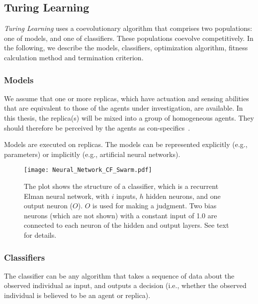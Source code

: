 \subsection{Turing Learning}\label{sec:turing_learning_swarm_simulation}

\textit{Turing Learning} uses a coevolutionary algorithm that comprises two populations: one of models, and one of classifiers. These populations coevolve competitively. In the following, we describe the models, classifiers, optimization algorithm, fitness calculation method and termination criterion. 

\subsubsection{Models} 

We assume that one or more replicas, which have actuation and sensing abilities that are equivalent to those of the agents under investigation, are available. In this thesis, the replica(s) will be mixed into a group of homogeneous agents. They should therefore be perceived by the agents as con-specifics~\cite{J.Halloy2007}. 

Models are executed on replicas. The models can be represented explicitly (e.g., parameters) or implicitly (e.g., artificial neural networks). %

\begin{figure}[!t]
	\centering
	\texttt{[image: Neural\_Network\_CF\_Swarm.pdf]}
	\caption{The plot shows the structure of a classifier, which is a recurrent Elman neural 
    network, with $i$ inputs, $h$ hidden neurons, and one output neuron ($O$). $O$ is used for making a judgment. Two bias neurons (which are not shown) with a constant input of 1.0 are connected to each neuron of the hidden and output layers. See text for details.}
	\label{fig:neural_network_cf_swarm}
\end{figure}

\subsubsection{Classifiers}

The classifier can be any algorithm that takes a sequence of data about the observed individual as input, and outputs a decision (i.e., whether the observed individual is believed to be an agent or replica). 

